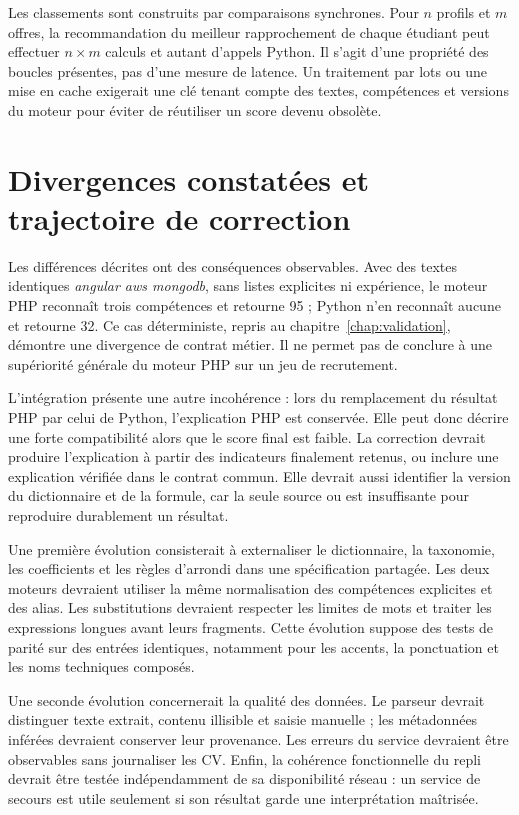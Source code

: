 Les classements sont construits par comparaisons synchrones. Pour $n$ profils et $m$ offres, la recommandation du meilleur rapprochement de chaque étudiant peut effectuer $n\times m$ calculs et autant d'appels Python. Il s'agit d'une propriété des boucles présentes, pas d'une mesure de latence. Un traitement par lots ou une mise en cache exigerait une clé tenant compte des textes, compétences et versions du moteur pour éviter de réutiliser un score devenu obsolète.

\section{Divergences constatées et trajectoire de correction}

Les différences décrites ont des conséquences observables. Avec des textes identiques \emph{angular aws mongodb}, sans listes explicites ni expérience, le moteur PHP reconnaît trois compétences et retourne 95 ; Python n'en reconnaît aucune et retourne 32. Ce cas déterministe, repris au chapitre~\ref{chap:validation}, démontre une divergence de contrat métier. Il ne permet pas de conclure à une supériorité générale du moteur PHP sur un jeu de recrutement.

L'intégration présente une autre incohérence : lors du remplacement du résultat PHP par celui de Python, l'explication PHP est conservée. Elle peut donc décrire une forte compatibilité alors que le score final est faible. La correction devrait produire l'explication à partir des indicateurs finalement retenus, ou inclure une explication vérifiée dans le contrat commun. Elle devrait aussi identifier la version du dictionnaire et de la formule, car la seule source  ou  est insuffisante pour reproduire durablement un résultat.

Une première évolution consisterait à externaliser le dictionnaire, la taxonomie, les coefficients et les règles d'arrondi dans une spécification partagée. Les deux moteurs devraient utiliser la même normalisation des compétences explicites et des alias. Les substitutions devraient respecter les limites de mots et traiter les expressions longues avant leurs fragments. Cette évolution suppose des tests de parité sur des entrées identiques, notamment pour les accents, la ponctuation et les noms techniques composés.

Une seconde évolution concernerait la qualité des données. Le parseur devrait distinguer texte extrait, contenu illisible et saisie manuelle ; les métadonnées inférées devraient conserver leur provenance. Les erreurs du service devraient être observables sans journaliser les CV. Enfin, la cohérence fonctionnelle du repli devrait être testée indépendamment de sa disponibilité réseau : un service de secours est utile seulement si son résultat garde une interprétation maîtrisée.

